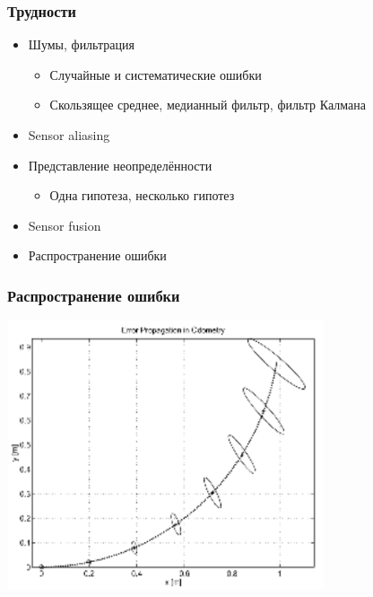 \documentclass{../../slides-style}
\begin{document}
    \begin{frame}
        \frametitle{Трудности}
        \begin{itemize}
            \item Шумы, фильтрация
            \begin{itemize}
                \item Случайные и систематические ошибки
                \item Скользящее среднее, медианный фильтр, фильтр Калмана
            \end{itemize}
            \item Sensor aliasing
            \item Представление неопределённости
            \begin{itemize}
                \item Одна гипотеза, несколько гипотез
            \end{itemize}
            \item Sensor fusion
            \item Распространение ошибки
        \end{itemize}
    \end{frame}

    \begin{frame}
        \frametitle{Распространение ошибки}
        \begin{center}
            \includegraphics[width=0.7\textwidth]{poseUncertainity.png}
        \end{center}
    \end{frame}
\end{document}
